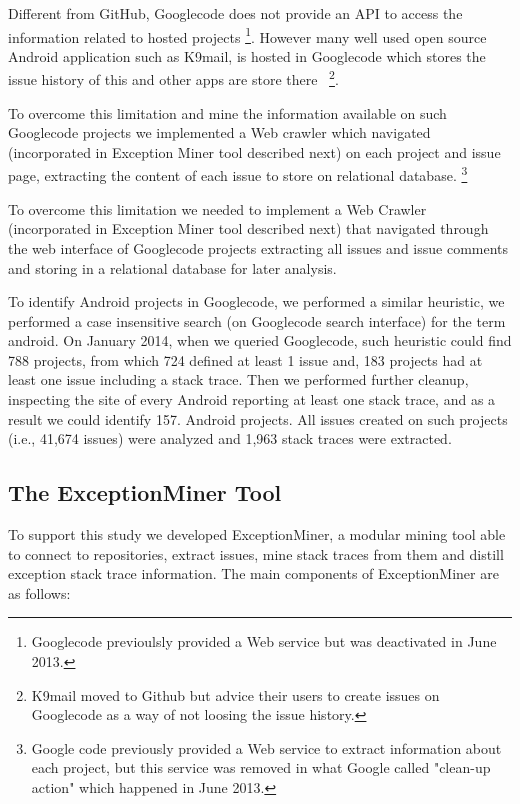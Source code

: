 \documentclass[conference]{IEEEtran}
\begin{document}
Different from GitHub, Googlecode does not provide an API to access the information related
 to hosted projects \footnote{Googlecode previoulsly provided a Web service but was deactivated in June 2013.}.
However many well used open source Android application such as K9mail, is hosted in Googlecode which stores
the issue history of this and other apps are store there ~\footnote{K9mail moved to Github but advice their 
users to create issues on Googlecode as a way of not loosing the issue history.}.

To overcome this limitation and mine the information available on such Googlecode 
projects we implemented a Web crawler which navigated (incorporated in Exception Miner tool described next) 
 on each project and issue page, extracting the content of each issue to store on relational database. \footnote{Google code previously provided a Web service to extract information about each project, but this service was removed in what Google called "clean-up action" which happened in June 2013.}

To overcome this limitation we needed to implement a Web Crawler (incorporated in Exception Miner tool described next) that navigated 
through the web interface of Googlecode projects extracting all issues and issue comments and storing in a relational database for later analysis.

To identify Android projects in Googlecode, we performed a similar heuristic, we performed a case insensitive search 
(on Googlecode search interface) for the term \textsf{android}.  On January 2014, when we queried Googlecode, such heuristic could
 find 788  projects, from which 724 defined at least 1 issue and, 183 projects 
had at least one issue including a stack trace. Then we performed further cleanup, inspecting the site of every Android
reporting at least one stack trace, and as a result we could identify 157. 
Android projects.  All issues created on such projects (i.e., 41,674 issues) were analyzed and 1,963 stack traces 
were extracted.

\subsection{The ExceptionMiner Tool}
\label{sec:exceptionminer}

To support this study we developed ExceptionMiner, a modular mining tool able 
to connect to repositories, extract issues, mine stack traces from
them and distill exception stack trace information. The main components of
ExceptionMiner are as follows:
\end{document}
